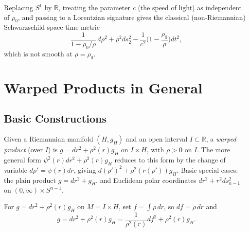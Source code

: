 \begin{remark}
  \label{rem:pet-ch4-schwarzschild-physical}
  Replacing $S^1$ by $\mathbb{R}$, treating the parameter $c$ (the speed of light) as
  independent of $\rho_0$, and passing to a Lorentzian signature gives the
  classical (non-Riemannian) Schwarzschild space-time metric
  \[
    \frac1{1-\rho_0/\rho}\,d\rho^2+\rho^2ds_2^2-\frac1{c^2}\Big(1-\frac{\rho_0}\rho\Big)dt^2,
  \]
  which is not smooth at $\rho=\rho_0$.
\end{remark}

\section{Warped Products in General}

\subsection{Basic Constructions}

\begin{definition}
  \label{def:pet-ch4-warped-product-general}
  \leanok
  Given a Riemannian manifold $(H,g_H)$ and an open interval $I\subset\mathbb{R}$, a
  \emph{warped product} (over $I$) is $g=dr^2+\rho^2(r)g_H$ on $I\times H$, with
  $\rho>0$ on $I$. The more general form $\psi^2(r)dr^2+\rho^2(r)g_H$ reduces to
  this form by the change of variable $d\rho'=\psi(r)dr$, giving
  $d(\rho')^2+\rho^2(r(\rho'))g_H$. Basic special cases: the plain product
  $g=dr^2+g_H$, and Euclidean polar coordinates $dr^2+r^2ds_{n-1}^2$ on
  $(0,\infty)\times S^{n-1}$.
\end{definition}

\begin{definition}
  \label{def:pet-ch4-warping-potential-f}
  \leanok
  For $g=dr^2+\rho^2(r)g_H$ on $M=I\times H$, set $f=\int\rho\,dr$, so $df=\rho\,dr$
  and
  \[
    g=dr^2+\rho^2(r)g_H=\frac1{\rho^2(r)}df^2+\rho^2(r)g_H.
  \]
\end{definition}

